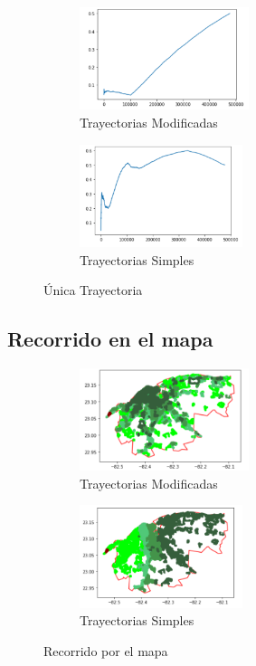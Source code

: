 \begin{figure}[h!]
	\centering
	\begin{subfigure}[b]{0.4\linewidth}
		\includegraphics[width=\linewidth, height=3cm]{Images/OneTrayecV.png}
		\caption{Trayectorias Modificadas}
		\label{fig:OnetrayectoriasM}
	\end{subfigure}
	\begin{subfigure}[b]{0.4\linewidth}
		\includegraphics[width=\linewidth, height=3cm]{Images/OneTrayecD.png}
		\caption{Trayectorias Simples}
		\label{fig:OnetrayectoriasS}
	\end{subfigure}
	
	\caption{Única Trayectoria}
	\label{fig:Onetrayectorias}
\end{figure}

\subsection{Recorrido en el mapa }

\begin{figure}[h!]
	\centering
	\begin{subfigure}[b]{0.4\linewidth}
		\includegraphics[width=\linewidth, height=3cm]{Images/TrayecVa.png}
		\caption{Trayectorias Modificadas}
		\label{fig:TrayecVa}
	\end{subfigure}
	\begin{subfigure}[b]{0.4\linewidth}
		\includegraphics[width=\linewidth, height=3cm]{Images/TrayecDis.png}
		\caption{Trayectorias Simples}
		\label{fig:TrayecDis}
	\end{subfigure}
	
	\caption{Recorrido por el mapa}
	\label{fig:RecorridoTrayectorias}
\end{figure}

